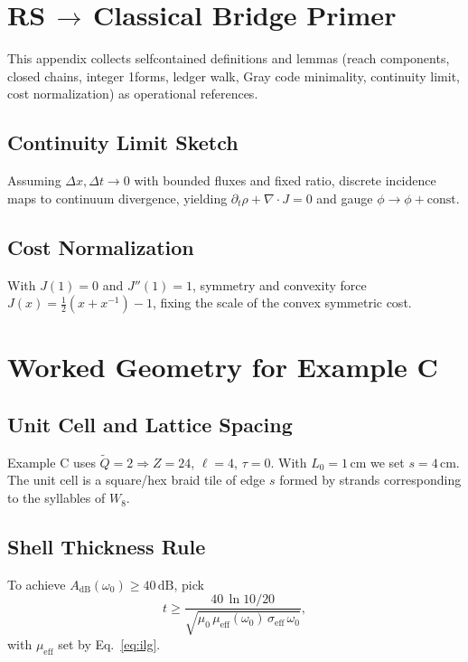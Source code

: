 \documentclass[11pt,a4paper]{article}
\begin{document}
\appendix

\section{RS\texorpdfstring{\,$\to$\,}{->}Classical Bridge Primer}
\label{app:primer}
This appendix collects self\textendash contained definitions and lemmas (reach components, closed chains, integer 1\textendash forms, ledger walk, Gray code minimality, continuity limit, cost normalization) as operational references.

\subsection{Continuity Limit Sketch}
Assuming \(\Delta x, \Delta t\to 0\) with bounded fluxes and fixed ratio, discrete incidence maps to continuum divergence, yielding \(\partial_t \rho + \nabla\cdot J = 0\) and gauge \(\phi\to \phi + \mathrm{const}\).

\subsection{Cost Normalization}
With \(J(1)=0\) and \(J''(1)=1\), symmetry and convexity force \(J(x)=\tfrac{1}{2}(x+x^{-1})-1\), fixing the scale of the convex symmetric cost.

\section{Worked Geometry for Example C}
\label{sec:geometry-worked}
\subsection{Unit Cell and Lattice Spacing}
Example C uses \(\tilde Q=2\Rightarrow Z=24\), \(\ell=4\), \(\tau=0\). With \(L_0=1\,\mathrm{cm}\) we set \(s=4\,\mathrm{cm}\). The unit cell is a square/hex braid tile of edge \(s\) formed by strands corresponding to the syllables of \(W_8\).

\subsection{Shell Thickness Rule}
To achieve \(A_{\mathrm{dB}}(\omega_0)\ge 40\,\mathrm{dB}\), pick
\begin{equation}
  t \ge \frac{40\,\ln 10/20}{\sqrt{\mu_0\,\mu_{\mathrm{eff}}(\omega_0)\,\sigma_{\mathrm{eff}}\,\omega_0}},\label{eq:t-rule}
\end{equation}
with \(\mu_{\mathrm{eff}}\) set by Eq.~\eqref{eq:ilg}.
\end{document}
